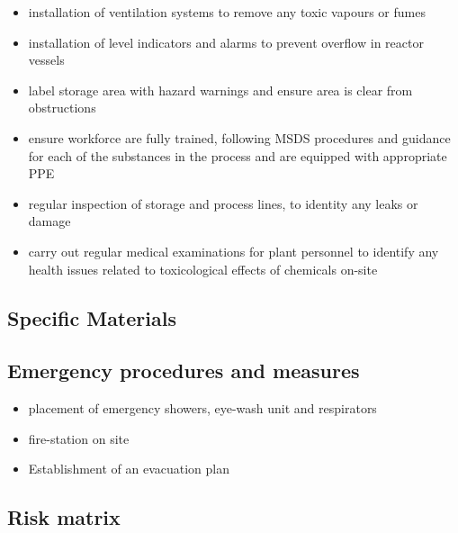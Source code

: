 \begin{itemize}
    \item installation of ventilation systems to remove any toxic vapours or fumes 
    \item installation of level indicators and alarms to prevent overflow in reactor vessels 
    \item label storage area with hazard warnings and ensure area is clear from obstructions
    \item ensure workforce are fully trained, following MSDS procedures and guidance for each of the substances in the process and are equipped with appropriate PPE 
    \item regular inspection of storage and process lines, to identity any leaks or damage
    \item carry out regular medical examinations for plant personnel to identify any health issues related to toxicological effects of chemicals on-site
\end{itemize}


\subsection{Specific Materials}

\subsection{Emergency procedures and measures}

\begin{itemize}
    \item placement of emergency showers, eye-wash unit and respirators
    \item fire-station on site 
    \item Establishment of an evacuation plan 
\end{itemize}




\subsection{Risk matrix}

